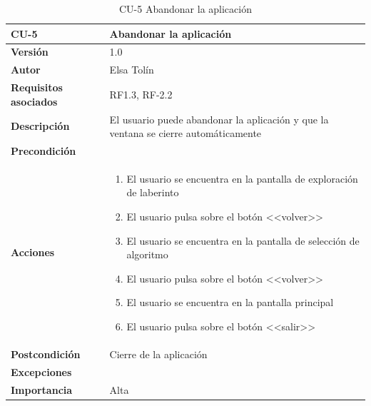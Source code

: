 \begin{table}[p]
	\centering
	\begin{tabularx}{\linewidth}{ p{} p{} }
			\toprule
			\textbf{CU-5}    & \textbf{Abandonar la aplicación}\\
			\toprule
			\textbf{Versión}              & 1.0    \\
			\textbf{Autor}                & Elsa Tolín \\
			\textbf{Requisitos asociados} & RF1.3, RF-2.2 \\
			\textbf{Descripción}          & El usuario puede abandonar la aplicación y que la ventana se cierre automáticamente\\
			\textbf{Precondición}         & \\
			\textbf{Acciones}             &
			\begin{enumerate}
					\def\labelenumi{\arabic{enumi}.}
					\tightlist
					\item El usuario se encuentra en la pantalla de exploración de laberinto
                    \item El usuario pulsa sobre el botón <<volver>>
                    \item El usuario se encuentra en la pantalla de selección de algoritmo
                    \item El usuario pulsa sobre el botón <<volver>>
                    \item El usuario se encuentra en la pantalla principal
                    \item El usuario pulsa sobre el botón <<salir>>
				\end{enumerate}\\
			\textbf{Postcondición}        & Cierre de la aplicación\\
			\textbf{Excepciones}          & \\
			\textbf{Importancia}          & Alta\\
			\bottomrule
		\end{tabularx}
	\caption{CU-5 Abandonar la aplicación}
\end{table}

